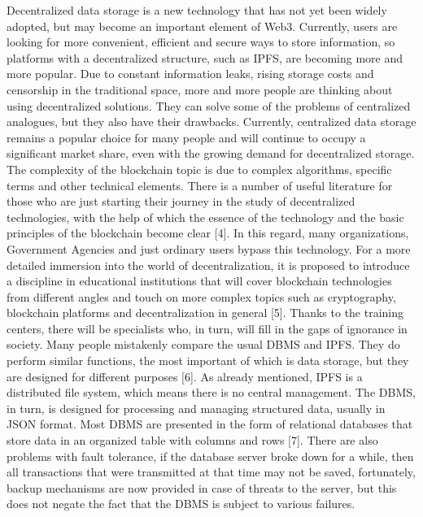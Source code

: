 \documentclass[10pt,conference,a4paper]{IEEEtran_EDM}
\begin{document}
Decentralized data storage is a new technology that has not yet been widely adopted, but may become an important element of Web3. Currently, users are looking for more convenient, efficient and secure ways to store information, so platforms with a decentralized structure, such as IPFS, are becoming more and more popular. Due to constant information leaks, rising storage costs and censorship in the traditional space, more and more people are thinking about using decentralized solutions. They can solve some of the problems of centralized analogues, but they also have their drawbacks. Currently, centralized data storage remains a popular choice for many people and will continue to occupy a significant market share, even with the growing demand for decentralized storage.
The complexity of the blockchain topic is due to complex algorithms, specific terms and other technical elements. There is a number of useful literature for those who are just starting their journey in the study of decentralized technologies, with the help of which the essence of the technology and the basic principles of the blockchain become clear [4]. In this regard, many organizations, Government Agencies and just ordinary users bypass this technology. For a more detailed immersion into the world of decentralization, it is proposed to introduce a discipline in educational institutions that will cover blockchain technologies from different angles and touch on more complex topics such as cryptography, blockchain platforms and decentralization in general [5]. Thanks to the training centers, there will be specialists who, in turn, will fill in the gaps of ignorance in society. 
Many people mistakenly compare the usual DBMS and IPFS. They do perform similar functions, the most important of which is data storage, but they are designed for different purposes [6]. As already mentioned, IPFS is a distributed file system, which means there is no central management. The DBMS, in turn, is designed for processing and managing structured data, usually in JSON format. Most DBMS are presented in the form of relational databases that store data in an organized table with columns and rows [7]. There are also problems with fault tolerance, if the database server broke down for a while, then all transactions that were transmitted at that time may not be saved, fortunately, backup mechanisms are now provided in case of threats to the server, but this does not negate the fact that the DBMS is subject to various failures. 
\end{document}

